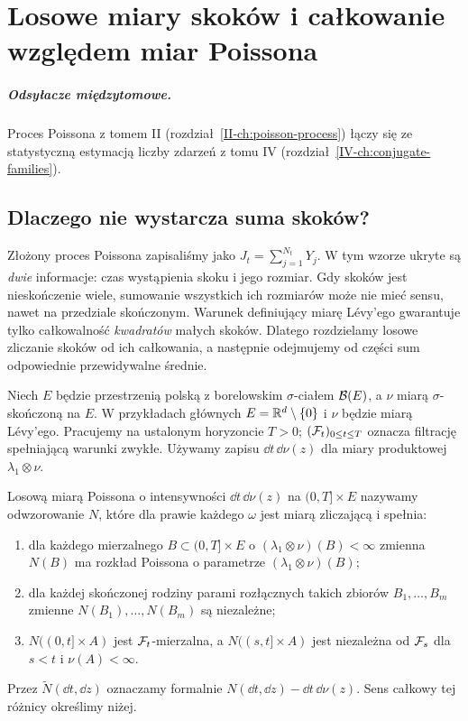 \chapter{Losowe miary skoków i całkowanie względem miar Poissona}
\label{ch:poisson-random-measure}
\paragraph{Odsyłacze międzytomowe.} Proces Poissona z tomem II (rozdział~\ref{II-ch:poisson-process}) łączy się ze statystyczną estymacją liczby zdarzeń z tomu IV (rozdział~\ref{IV-ch:conjugate-families}).


\section{Dlaczego nie wystarcza suma skoków?}

Złożony proces Poissona zapisaliśmy jako $J_t=\sum_{j=1}^{N_t}Y_j$.
W tym wzorze ukryte są \emph{dwie} informacje: czas wystąpienia
skoku i jego rozmiar. Gdy skoków jest nieskończenie wiele, sumowanie
wszystkich ich rozmiarów może nie mieć sensu, nawet na przedziale
skończonym. Warunek definiujący miarę Lévy'ego gwarantuje tylko
całkowalność \emph{kwadratów} małych skoków. Dlatego rozdzielamy
losowe zliczanie skoków od ich całkowania, a następnie odejmujemy
od części sum odpowiednie przewidywalne średnie.

Niech $E$ będzie przestrzenią polską z borelowskim $\sigma$-ciałem
$\mathcal{B}(E)$, a $\nu$ miarą $\sigma$-skończoną na $E$.
W przykładach głównych $E=\mathbb{R}^d\setminus\{0\}$ i $\nu$ będzie
miarą Lévy'ego. Pracujemy na ustalonym horyzoncie $T>0$;
$(\mathcal{F}_t)_{0\le t\le T}$ oznacza filtrację spełniającą warunki
zwykłe. Używamy zapisu $\dd t\,\dd\nu(z)$ dla miary
produktowej $\lambda_1\otimes\nu$.

\begin{definicja}
\label{def:PRM}
Losową miarą Poissona o intensywności $\dd t\,\dd\nu(z)$ na
$(0,T]\times E$ nazywamy odwzorowanie $N$, które dla prawie każdego
$\omega$ jest miarą zliczającą i spełnia:
\begin{enumerate}
\item dla każdego mierzalnego $B\subset(0,T]\times E$ o
$(\lambda_1\otimes\nu)(B)<\infty$ zmienna $N(B)$ ma rozkład
Poissona o parametrze $(\lambda_1\otimes\nu)(B)$;
\item dla każdej skończonej rodziny parami rozłącznych takich
zbiorów $B_1,\ldots,B_m$ zmienne $N(B_1),\ldots,N(B_m)$ są niezależne;
\item $N((0,t]\times A)$ jest $\mathcal{F}_t$-mierzalna, a
$N((s,t]\times A)$ jest niezależna od $\mathcal{F}_s$ dla $s<t$
i $\nu(A)<\infty$.
\end{enumerate}
Przez $\widetilde N(\dd t,\dd z)$ oznaczamy formalnie
$N(\dd t,\dd z)-\dd t\,\dd\nu(z)$. Sens całkowy tej różnicy
określimy niżej.
\end{definicja}

